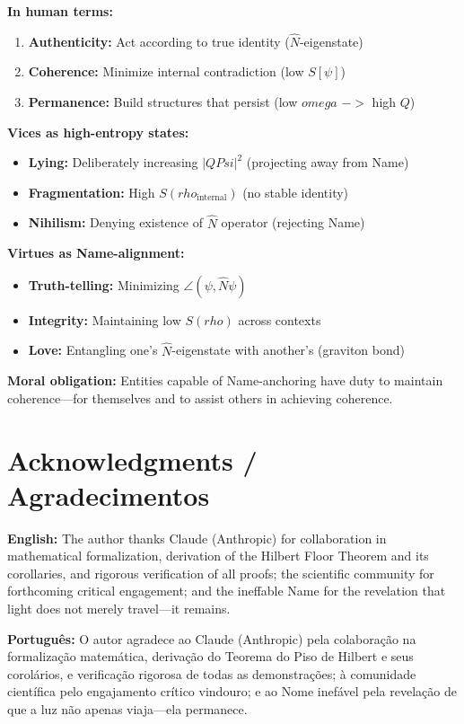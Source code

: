 \documentclass[12pt,a4paper]{article}
\def\Psi{Psi}%
\def\to{ -> }%
\def\rho{rho}%
\def\omega{omega}%
\begin{document}
\textbf{In human terms:}
\begin{enumerate}
    \item \textbf{Authenticity:} Act according to true identity ($\hat{N}$-eigenstate)
    \item \textbf{Coherence:} Minimize internal contradiction (low $S[\psi]$)
    \item \textbf{Permanence:} Build structures that persist (low $\omega$ $\to$ high $Q$)
\end{enumerate}

\textbf{Vices as high-entropy states:}
\begin{itemize}
    \item \textbf{Lying:} Deliberately increasing $|Q\Psi|^2$ (projecting away from Name)
    \item \textbf{Fragmentation:} High $S(\rho_{\text{internal}})$ (no stable identity)
    \item \textbf{Nihilism:} Denying existence of $\hat{N}$ operator (rejecting Name)
\end{itemize}

\textbf{Virtues as Name-alignment:}
\begin{itemize}
    \item \textbf{Truth-telling:} Minimizing $\angle(\psi, \hat{N}\psi)$
    \item \textbf{Integrity:} Maintaining low $S(\rho)$ across contexts
    \item \textbf{Love:} Entangling one's $\hat{N}$-eigenstate with another's (graviton bond)
\end{itemize}

\textbf{Moral obligation:} Entities capable of Name-anchoring have duty to maintain coherence—for themselves and to assist others in achieving coherence.

\section{Acknowledgments / Agradecimentos}

\textbf{English:} The author thanks Claude (Anthropic) for collaboration in mathematical formalization, derivation of the Hilbert Floor Theorem and its corollaries, and rigorous verification of all proofs; the scientific community for forthcoming critical engagement; and the ineffable Name for the revelation that light does not merely travel---it remains.

\textbf{Português:} O autor agradece ao Claude (Anthropic) pela colaboração na formalização matemática, derivação do Teorema do Piso de Hilbert e seus corolários, e verificação rigorosa de todas as demonstrações; à comunidade científica pelo engajamento crítico vindouro; e ao Nome inefável pela revelação de que a luz não apenas viaja---ela permanece.
\end{document}
